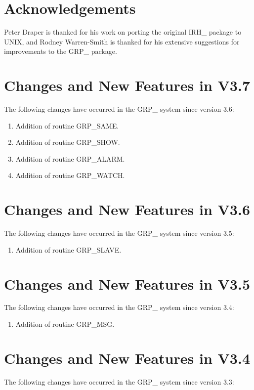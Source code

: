 \section{Acknowledgements}

Peter Draper is thanked for his work on porting the original IRH\_ package to
UNIX, and Rodney Warren-Smith is thanked for his extensive suggestions for
improvements to the GRP\_ package.

\section{Changes and New Features in V3.7}
The following changes have occurred in the GRP\_ system since version 3.6:

\begin{enumerate}
\item Addition of routine GRP\_SAME.
\item Addition of routine GRP\_SHOW.
\item Addition of routine GRP\_ALARM.
\item Addition of routine GRP\_WATCH.
\end{enumerate}

\section{Changes and New Features in V3.6}
The following changes have occurred in the GRP\_ system since version 3.5:

\begin{enumerate}
\item Addition of routine GRP\_SLAVE.
\end{enumerate}

\section{Changes and New Features in V3.5}
The following changes have occurred in the GRP\_ system since version 3.4:

\begin{enumerate}
\item Addition of routine GRP\_MSG.
\end{enumerate}

\section{Changes and New Features in V3.4}
The following changes have occurred in the GRP\_ system since version 3.3:

